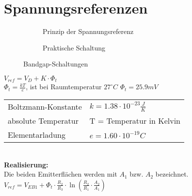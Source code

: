\section{Spannungsreferenzen}
\begin{figure}[!h]
	\centering
	\begin{subfigure}[b]{10cm}
		\centering
		\caption{Prinzip der Spannungsreferenz}
	\end{subfigure}\qquad
	\begin{subfigure}[b]{8cm}
		\centering
		\caption{Praktische Schaltung}
	\end{subfigure}
	\caption{Bandgap-Schaltungen}
	\label{fig:spannungsreferenzen}
\end{figure}

$V_{ref}=V_D+K\cdot \Phi_t$\\
$\Phi_t = \frac{kT}{e}$, ist bei Raumtemperatur $27^\circ C$ $\Phi_t=25.9mV$\\
\begin{tabular}{ll}
Boltzmann-Konstante & $k=1.38\cdot 10^{-23}\frac{J}{K}$\\
absolute Temperatur & T = Temperatur in Kelvin\\
Elementarladung & $e=1.60\cdot 10^{-19}C$\\
\end{tabular}\\
\textbf{Realisierung:}\\
Die beiden Emitterflächen werden mit $A_1$ bzw. $A_2$ bezeichnet.\\
$V_{ref}=V_{EB1}+\Phi_t\cdot\frac{R_2}{R_3}\cdot\ln\left(\frac{R_2}{R_1}\cdot\frac{A_2}{A_1}\right)$